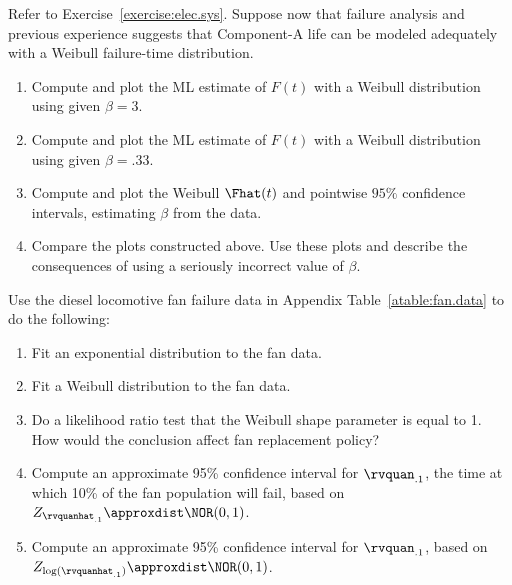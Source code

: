 \begin{exercise}
Refer to Exercise~\ref{exercise:elec.sys}. Suppose
now that failure analysis and previous experience suggests that
Component-A life
can be modeled adequately with a Weibull failure-time distribution.
\begin{enumerate}
\item
Compute and plot the ML estimate of $F(t)$ with a Weibull 
distribution using given $\beta=3$.
\item
Compute and plot the ML estimate of $F(t)$ with a Weibull
distribution using given $\beta=.33$.
\item
Compute and plot the Weibull $\Fhat(t)$ and pointwise $95\%$
confidence intervals, estimating $\beta$ from the data.
\item
Compare the plots constructed above. Use these plots and
describe the consequences of using a seriously incorrect value of
$\beta$.
\end{enumerate}
\end{exercise}

\begin{exercise}
Use the diesel locomotive fan failure data in
Appendix Table~\ref{atable:fan.data} to do the following:
\begin{enumerate}
\item 
Fit an exponential distribution to the fan data.  
\item
Fit a Weibull distribution to the fan data.  
\item 
Do a
likelihood ratio test that the Weibull
shape parameter is equal to 1. How would the conclusion affect
fan replacement policy?  
\item 
Compute an approximate 95\% confidence interval for $\rvquan_{.1}$,
the time at which 10\% of the fan population will fail, based
on $Z_{\rvquanhat_{.1}}
\approxdist \NOR(0,1)$.  
\item 
Compute an approximate 95\% confidence interval for $\rvquan_{.1}$,
based on $Z_{\log(\rvquanhat_{.1})}
\approxdist \NOR(0,1)$.
\end{enumerate}
\end{exercise}


